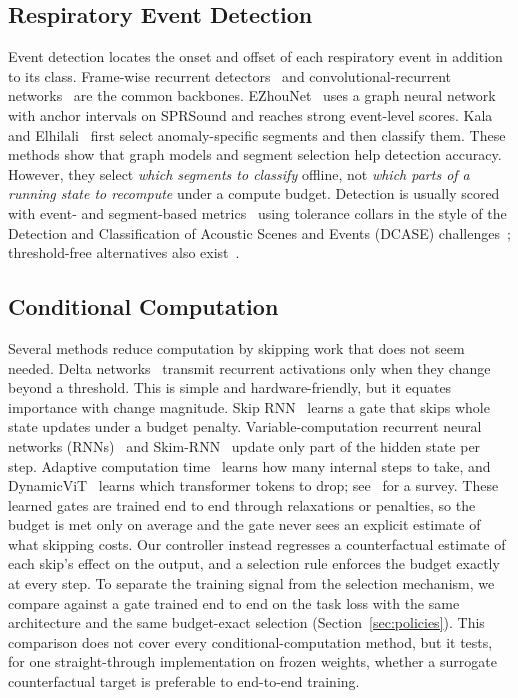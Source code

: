 \subsection{Respiratory Event Detection}
Event detection locates the onset and offset of each respiratory event in addition to its class. Frame-wise recurrent detectors~\cite{hsu2021benchmarking} and convolutional-recurrent networks~\cite{cakir2017convolutional} are the common backbones. EZhouNet~\cite{chu2026ezhounet} uses a graph neural network with anchor intervals on SPRSound and reaches strong event-level scores. Kala and Elhilali~\cite{kala2026multistage} first select anomaly-specific segments and then classify them. These methods show that graph models and segment selection help detection accuracy. However, they select \emph{which segments to classify} offline, not \emph{which parts of a running state to recompute} under a compute budget. Detection is usually scored with event- and segment-based metrics~\cite{mesaros2016metrics} using tolerance collars in the style of the Detection and Classification of Acoustic Scenes and Events (DCASE) challenges~\cite{turpault2019sound}; threshold-free alternatives also exist~\cite{bilen2020framework,ebbers2022threshold}.

\subsection{Conditional Computation}
\label{sec:related-cc}
Several methods reduce computation by skipping work that does not seem needed. Delta networks~\cite{neil2017delta} transmit recurrent activations only when they change beyond a threshold. This is simple and hardware-friendly, but it equates importance with change magnitude. Skip RNN~\cite{campos2018skip} learns a gate that skips whole state updates under a budget penalty. Variable-computation recurrent neural networks (RNNs)~\cite{jernite2017variable} and Skim-RNN~\cite{seo2018neural} update only part of the hidden state per step. Adaptive computation time~\cite{graves2016adaptive} learns how many internal steps to take, and DynamicViT~\cite{rao2021dynamicvit} learns which transformer tokens to drop; see~\cite{han2022dynamic} for a survey. These learned gates are trained end to end through relaxations or penalties, so the budget is met only on average and the gate never sees an explicit estimate of what skipping costs. Our controller instead regresses a counterfactual estimate of each skip's effect on the output, and a selection rule enforces the budget exactly at every step. To separate the training signal from the selection mechanism, we compare against a gate trained end to end on the task loss with the same architecture and the same budget-exact selection (Section~\ref{sec:policies}). This comparison does not cover every conditional-computation method, but it tests, for one straight-through implementation on frozen weights, whether a surrogate counterfactual target is preferable to end-to-end training.

